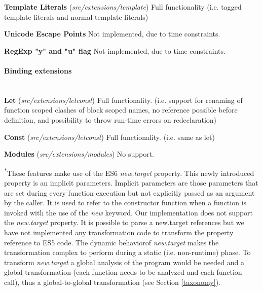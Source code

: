 \textbf{Template Literals} (\textit{src/extensions/template}) 
Full functionality (i.e. tagged template literals and normal template literals)

\textbf{Unicode Escape Points}
Not implemented, due to time constraints.

\textbf{RegExp "y" and "u" flag}
Not implemented, due to time constraints.

\paragraph{Binding extensions}\mbox{}\\
\textbf{Let} (\textit{src/extensions/letconst}) \newline
Full functionality. (i.e. support for renaming of function scoped clashes of block scoped names, no reference possible before definition, and possibility to throw run-time errors on redeclaration)

\textbf{Const} (\textit{src/extensions/letconst}) \newline
Full functionality. (i.e. same as let)

\textbf{Modules} (\textit{src/extensions/modules}) 
No support.

\textsuperscript{*}These features make use of the ES6 \textit{new.target} property. This newly introduced property is an implicit parameters. Implicit parameters are those parameters that are set during every function execution but not explicitly passed as an argument by the caller. It is used to refer to the constructor function when a function is invoked with the use of the \textit{new} keyword.
Our implementation does not support the \textit{new.target} property. It is possible to parse a new.target references but we have not implemented any transformation code to transform the property reference to ES5 code. The dynamic behavior\footnotemark of \textit{new.target} makes the transformation complex to perform during a static (i.e. non-runtime) phase. To transform \textit{new.target} a global analysis of the program would be needed and a global transformation (each function needs to be analyzed and each function call), thus a global-to-global transformation (see Section \ref{taxonomy}).


